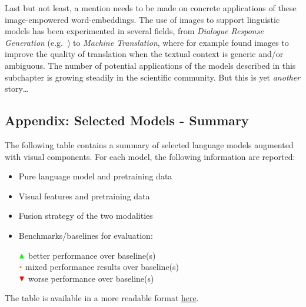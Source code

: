 \documentclass[
]{krantz}
\begin{document}
Last but not least, a mention needs to be made on concrete applications of these image-empowered word-embeddings. The use of images to support linguistic models has been experimented in several fields, from \emph{Dialogue Response Generation} (e.g.~\citet{sun2021multimodal}) to \emph{Machine Translation}, where for example \citet{ive2019distilling} found images to improve the quality of translation when the textual context is generic and/or ambiguous. The number of potential applications of the models described in this subchapter is growing steadily in the scientific community. But this is yet \emph{another} story\ldots{}

\hypertarget{appendix-selected-models---summary}{%
\subsection{Appendix: Selected Models - Summary}\label{appendix-selected-models---summary}}

The following table contains a summary of selected language models augmented with visual components. For each model, the following information are reported:

\begin{itemize}
\item
  Pure language model and pretraining data
\item
  Visual features and pretraining data
\item
  Fusion strategy of the two modalities
\item
  Benchmarks/baselines for evaluation:

  \(\color{green}\blacktriangle\) better performance over baseline(s)\\
  \(\color{orange}\bullet\) mixed performance results over baseline(s)\\
  \(\color{red}\blacktriangledown\) worse performance over baseline(s)\\
\end{itemize}

The table is available in a more readable format \href{Table-ch2-3-final.pdf}{here}.
\end{document}
